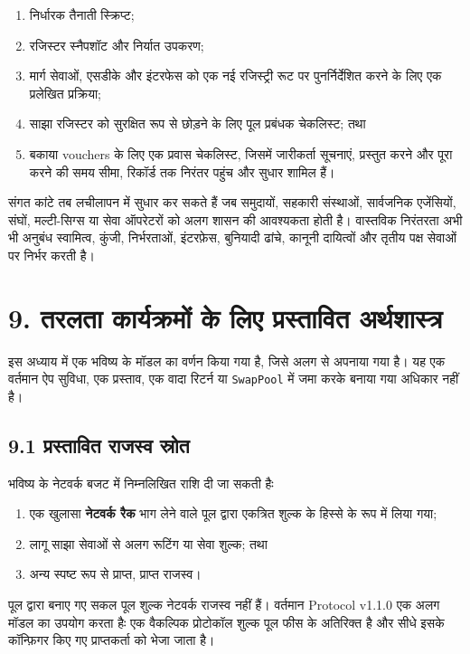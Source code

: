 \documentclass[11pt]{article}
\begin{document}
\begin{enumerate}[leftmargin=*]
\item निर्धारक तैनाती स्क्रिप्ट;
\item रजिस्टर स्नैपशॉट और निर्यात उपकरण;
\item मार्ग सेवाओं, एसडीके और इंटरफेस को एक नई रजिस्ट्री रूट पर पुनर्निर्देशित करने के लिए एक प्रलेखित प्रक्रिया;
\item साझा रजिस्टर को सुरक्षित रूप से छोड़ने के लिए पूल प्रबंधक चेकलिस्ट; तथा
\item बकाया vouchers के लिए एक प्रवास चेकलिस्ट, जिसमें जारीकर्ता सूचनाएं, प्रस्तुत करने और पूरा करने की समय सीमा, रिकॉर्ड तक निरंतर पहुंच और सुधार शामिल हैं।
\end{enumerate}
संगत कांटे तब लचीलापन में सुधार कर सकते हैं जब समुदायों, सहकारी संस्थाओं, सार्वजनिक एजेंसियों, संघों, मल्टी-सिग्स या सेवा ऑपरेटरों को अलग शासन की आवश्यकता होती है। वास्तविक निरंतरता अभी भी अनुबंध स्वामित्व, कुंजी, निर्भरताओं, इंटरफ़ेस, बुनियादी ढांचे, कानूनी दायित्वों और तृतीय पक्ष सेवाओं पर निर्भर करती है।


\section*{9. तरलता कार्यक्रमों के लिए प्रस्तावित अर्थशास्त्र}

इस अध्याय में एक भविष्य के मॉडल का वर्णन किया गया है, जिसे अलग से अपनाया गया है। यह एक वर्तमान ऐप सुविधा, एक प्रस्ताव, एक वादा रिटर्न या \texttt{SwapPool} में जमा करके बनाया गया अधिकार नहीं है।

\subsection*{9.1 प्रस्तावित राजस्व स्रोत}

भविष्य के नेटवर्क बजट में निम्नलिखित राशि दी जा सकती हैः

\begin{enumerate}[leftmargin=*]
\item एक खुलासा \textbf{नेटवर्क रैक} भाग लेने वाले पूल द्वारा एकत्रित शुल्क के हिस्से के रूप में लिया गया;
\item लागू साझा सेवाओं से अलग रूटिंग या सेवा शुल्क; तथा
\item अन्य स्पष्ट रूप से प्राप्त, प्राप्त राजस्व।
\end{enumerate}
पूल द्वारा बनाए गए सकल पूल शुल्क नेटवर्क राजस्व नहीं हैं। वर्तमान Protocol v1.1.0 एक अलग मॉडल का उपयोग करता हैः एक वैकल्पिक प्रोटोकॉल शुल्क पूल फीस के अतिरिक्त है और सीधे इसके कॉन्फ़िगर किए गए प्राप्तकर्ता को भेजा जाता है।
\end{document}
